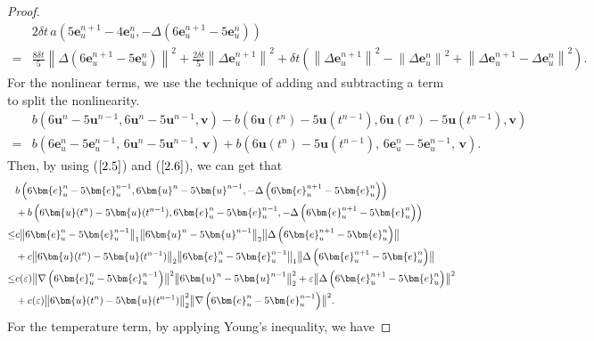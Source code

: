 \documentclass[10pt]{article}
\begin{document}
\begin{proof}
\begin{align}
			&2\delta t \, a\left(5\bm{e}_u^{n+1} - 4\bm{e}_u^n, -\Delta\left(6\bm{e}_u^{n+1} - 5\bm{e}_u^n\right)\right)  \\
			= & \frac{8\delta t}{5}\left\|\Delta\left(6\bm{e}_u^{n+1} - 5\bm{e}_u^n\right)\right\|^2 
			+ \frac{2\delta t}{5}\left\|\Delta\bm{e}_u^{n+1}\right\|^2  + \delta t\left(\left\|\Delta\bm{e}_u^{n+1}\right\|^2 
			- \left\|\Delta\bm{e}_u^{n}\right\|^2 
			+ \left\|\Delta\bm{e}_u^{n+1} - \Delta\bm{e}_u^{n}\right\|^2\right).\nonumber
		\end{align}
		For the nonlinear terms, we use the technique of adding and subtracting a term to split the nonlinearity.
		{ 
		\begin{align}
			&b\left(6\bm{u}^{n} - 5\bm{u}^{n-1}, 6\bm{u}^{n} - 5\bm{u}^{n-1}, \bm{v}\right)- b\left(6\bm{u}(t^{n}) - 5\bm{u}(t^{n-1}), 6\bm{u}(t^{n}) - 5\bm{u}(t^{n-1}), \bm{v}\right)\nonumber\\
			= & b\left(6\bm{e}_u^n - 5\bm{e}_u^{n-1}, \, 6\bm{u}^{n} - 5\bm{u}^{n-1}, \, \bm{v}\right)
			+ b\left(6\bm{u}(t^n) - 5\bm{u}(t^{n-1}), \, 6\bm{e}_u^{n} - 5\bm{e}_u^{n-1}, \, \bm{v}\right).
		\end{align}}
		Then, by using ($\ref{2.5}$) and ($\ref{2.6}$), we can get that
		{ 
		\begin{align}
			&b\left(6\bm{e}_u^n - 5\bm{e}_u^{n-1}, 6\bm{u}^{n} - 5\bm{u}^{n-1}, -\Delta\left(6\bm{e}_u^{n+1} - 5\bm{e}_u^n\right)\right)\\
			&  + b\left(6\bm{u}(t^n) - 5\bm{u}(t^{n-1}), 6\bm{e}_u^{n} - 5\bm{e}_u^{n-1},-\Delta\left(6\bm{e}_u^{n+1} - 5\bm{e}_u^n\right)\right)\notag\\
			\leq & c\bigl\|6\bm{e}_u^n - 5\bm{e}_u^{n-1}\bigr\|_1 
			\bigl\|6\bm{u}^{n} - 5\bm{u}^{n-1}\bigr\|_2 
			\bigl\|\Delta\left(6\bm{e}_u^{n+1} - 5\bm{e}_u^n\right)\bigr\| \notag \\
			&   + c\bigl\|6\bm{u}(t^n) - 5\bm{u}(t^{n-1})\bigr\|_2 
			\bigl\|6\bm{e}_u^{n} - 5\bm{e}_u^{n-1}\bigr\|_1 
			\bigl\|\Delta\left(6\bm{e}_u^{n+1} - 5\bm{e}_u^n\right)\bigr\| \notag \\
			\leq &   c(\varepsilon)\bigl\|\nabla\left(6\bm{e}_u^n - 5\bm{e}_u^{n-1}\right)\bigr\|^2 
			\bigl\|6\bm{u}^{n} - 5\bm{u}^{n-1}\bigr\|_2^2 
			+ \varepsilon\bigl\|\Delta\left(6\bm{e}_u^{n+1} - 5\bm{e}_u^n\right)\bigr\|^2\nonumber\\
			&  +c(\varepsilon)\bigl\|6\bm{u}(t^n) - 5\bm{u}(t^{n-1})\bigr\|_2^2 
			\bigl\|\nabla\left(6\bm{e}_u^{n} - 5\bm{e}_u^{n-1}\right)\bigr\|^2.\nonumber
		\end{align}}
		For the temperature term, by applying Young's inequality, we have

\end{proof}
\end{document}
